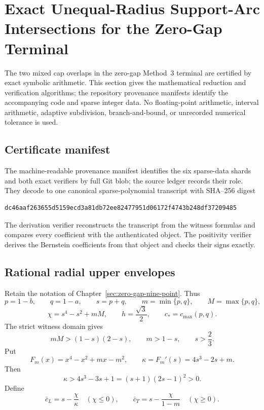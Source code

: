 \section{Exact Unequal-Radius Support-Arc Intersections for the Zero-Gap Terminal}
\label{sec:strategy4-exact-certificate}

The two mixed cap overlaps in the zero-gap Method~3 terminal are certified by exact symbolic
arithmetic.  This section gives the mathematical reduction and verification
algorithms; the repository provenance manifests identify the accompanying
code and sparse integer data.  No floating-point arithmetic, interval
arithmetic, adaptive subdivision, branch-and-bound, or unrecorded numerical
tolerance is used.

\subsection{Certificate manifest}

The machine-readable provenance manifest identifies the six sparse-data
shards and both exact verifiers by full Git blob; the source ledger records
their role.  They decode to one canonical sparse-polynomial transcript with
SHA--256 digest
\begin{verbatim}
dc46aaf263655d5159ecd3a81db72ee82477951d06172f4743b248df37209485
\end{verbatim}
The derivation verifier reconstructs the transcript from the witness formulas
and compares every coefficient with the authenticated object. The positivity
verifier derives the Bernstein coefficients from that object and checks their
signs exactly.

\subsection{Rational radial upper envelopes}

Retain the notation of Chapter~\ref{sec:zero-gap-nine-point}.  Thus
\[
 p=1-b,\qquad q=1-a,\qquad s=p+q,\qquad
 m=\min\{p,q\},\qquad M=\max\{p,q\},
\]
\[
 \chi=s^4-s^2+mM,\qquad h=\frac{\sqrt3}{2},\qquad
 c_*=c_{\max}(p,q).
\]
The strict witness domain gives
\begin{equation}
 mM>(1-s)(2-s),\qquad m>1-s,\qquad s>\frac23.
 \label{eq:certificate-domain}
\end{equation}
Put
\[
 F_m(x)=x^4-x^2+mx-m^2,\qquad
 \kappa=F_m'(s)=4s^3-2s+m.
\]
Then
\[
 \kappa>4s^3-3s+1=(s+1)(2s-1)^2>0.
\]
Define
\begin{equation}
 \bar c_L=s-\frac{\chi}{\kappa}\quad(\chi\le0),
 \qquad
 \bar c_T=s-\frac{\chi}{1-m}\quad(\chi\ge0).
 \label{eq:certificate-cbar}
\end{equation}

